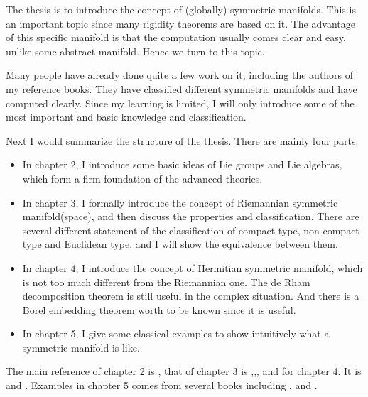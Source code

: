 The thesis is to introduce the concept of (globally) symmetric manifolds. This is an important topic since many rigidity theorems are based on it. The advantage of this specific manifold is that the computation usually comes clear and easy, unlike some abstract manifold. Hence we turn to this topic.

Many people have already done quite a few work on it, including the authors of my reference books. They have classified different symmetric manifolds and have computed clearly. Since my learning is limited, I will only introduce some of the most important and basic knowledge and classification.

Next I would summarize the structure of the thesis. There are mainly four parts:
\begin{itemize}
    \item In chapter 2, I introduce some basic ideas of Lie groups and Lie algebras, which form a firm foundation of the advanced theories.
    \item In chapter 3, I formally introduce the concept of Riemannian symmetric manifold(space), and then discuss the properties and classification. There are several different statement of the classification of compact type, non-compact type and Euclidean type, and I will show the equivalence between them.
    \item In chapter 4, I introduce the concept of Hermitian symmetric manifold, which is not too much different from the Riemannian one. The de Rham decomposition theorem is still useful in the complex situation. And there is a Borel embedding theorem worth to be known since it is useful.
    \item In chapter 5, I give some classical examples to show intuitively what a symmetric manifold is like.
\end{itemize}
The main reference of chapter 2 is \cite{Hel}, that of chapter 3 is \cite{Hel},\cite{Ziller},\cite{Besse}, and for chapter 4. It is \cite{Mok} and \cite{Ziller}. Examples in chapter 5 comes from several books including \cite{Peter},\cite{Ziller} and \cite{MR1451625}.











	 
	
